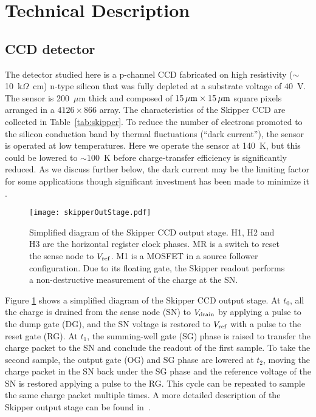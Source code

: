 \documentclass[aps,prl,reprint,superscriptaddress,floatfix,nofootinbib,showkeys,showpacs,preprintnumbers]{revtex4-1}
\begin{document}
\section{Technical Description}


\subsection{CCD detector}

The detector studied here is a p-channel CCD fabricated on high resistivity ($\sim$10~k$\Omega$~cm) n-type silicon that was fully depleted at a substrate voltage of $40$~V.  
The sensor is 200~$\mu$m thick and composed of $15 \mathrm{\,\mu m} \times 15 \mathrm{\,\mu m}$ square pixels arranged in a $4126 \times 866$ array. 
The characteristics of the Skipper CCD are collected in Table~\ref{tab:skipper}.  
To reduce the number of electrons promoted to the silicon conduction band by thermal fluctuations (``dark current''), the sensor is operated at low temperatures. 
Here we operate the sensor at 140~K, but this could be lowered to  $\sim 100$~K before charge-transfer efficiency is significantly reduced.  
As we discuss further below, the dark current may be the limiting factor for some applications though significant investment has been made to minimize it \citep{Holland:1989,Holland:2003}. 

\begin{figure}[!b]
\centering
\texttt{[image: skipperOutStage.pdf]}
\caption{Simplified diagram of the Skipper CCD output stage. H1, H2 and H3 are the horizontal register clock phases. MR is a switch to reset the sense node to $V_{\rm ref}$. M1 is a MOSFET in a source follower configuration. Due to its floating gate, the Skipper readout performs a non-destructive measurement of the charge at the SN.}
\label{fig:outStage}
\end{figure}

Figure \ref{fig:outStage} shows a simplified diagram of the Skipper CCD output stage. 
At $t_0$,  all the charge is drained from the sense node (SN) to $V_{\rm drain}$ by applying a pulse to the dump gate (DG), and the SN voltage is restored to $V_{\rm ref}$ with a pulse to the reset gate (RG). 
At $t_{1}$, the summing-well gate (SG) phase is raised to transfer the charge packet to the SN and conclude the readout of the first sample. 
To take the second sample, the output gate (OG) and SG phase are lowered at $t_{2}$, moving the charge packet in the SN back under the SG phase and the reference voltage of the SN is restored applying a pulse to the RG. This cycle can be repeated to sample the same charge packet multiple times. A more detailed description of the Skipper output stage can be found in~\cite{Moroni:2012}. 
\end{document}
